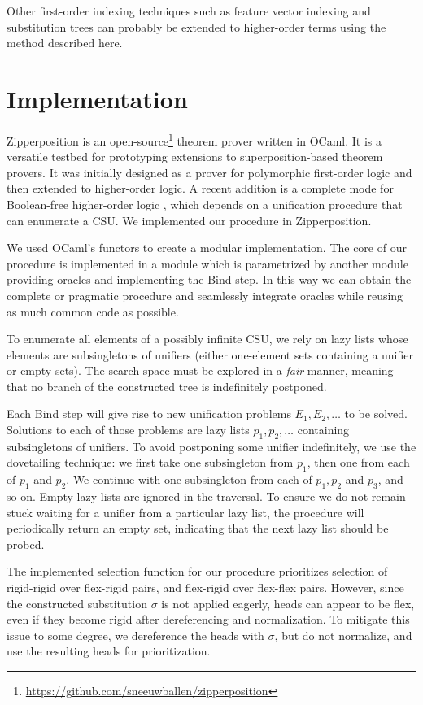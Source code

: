 Other first-order indexing techniques such as feature vector indexing and substitution trees
can probably be extended to higher-order terms using the method described here.


\section{Implementation}
\label{sec:unif:implementation}
Zipperposition \cite{sc-15-simon-phd, sc-supind-17} is an
open-source\footnote{\url{https://github.com/sneeuwballen/zipperposition}}
theorem prover written in OCaml.
It is a versatile testbed for prototyping extensions to
superposition-based theorem provers.
It was initially
designed as a prover for polymorphic first-order logic
and then extended to higher-order logic.
A recent addition is a complete mode for
Boolean-free higher-order logic \cite{bbtvw-21-sup-lam},
which depends on a unification procedure that can enumerate a CSU. 
We implemented our procedure in Zipperposition.

We used OCaml's functors to create a modular implementation. The core of our
procedure is implemented in a module which is parametrized by another module
providing oracles and implementing the \textsf{Bind} step. In this way we can
obtain the complete or pragmatic procedure and seamlessly integrate
oracles while reusing as much common code as possible.

To enumerate all elements of a possibly infinite CSU, we rely on lazy lists whose
elements are subsingletons of unifiers (either one-element sets containing a unifier
or empty sets). The search space must be explored in a {\em fair} manner,
meaning that no branch of the constructed tree is indefinitely postponed. 

Each {\sf Bind} step will give rise to new unification problems $E_1, E_2,
\ldots$ to be solved. Solutions to each of those problems are lazy lists $p_1,
p_2, \ldots$ containing subsingletons of unifiers. To avoid postponing some
unifier indefinitely, we use the dovetailing technique: we first take one
subsingleton from $p_1$, then one from each of $p_1$ and $p_2$. We continue with
one subsingleton from each of $p_1,p_2$ and $p_3$, and so on. Empty lazy lists are
ignored in the traversal. To ensure we do not remain stuck waiting for a unifier
from a particular lazy list, the procedure will periodically return an empty
set, indicating that the next lazy list should be probed. 

The implemented selection function for our procedure prioritizes selection of
rigid-rigid over flex-rigid pairs, and flex-rigid over flex-flex pairs. However,
since the constructed substitution $\sigma$ is not applied eagerly, heads can
appear to be flex, even if they become rigid after dereferencing and
normalization. To mitigate this issue to some degree, we
dereference the heads with $\sigma$, but do not normalize, and use the resulting
heads for prioritization.

